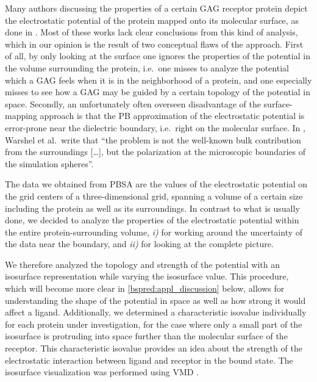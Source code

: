 Many authors discussing the properties of a certain GAG receptor protein depict
the electrostatic potential of the protein mapped onto its molecular surface, as
done in \cite{rogers_gag_prot_prot_2011,%
Gandhi01102009,sapay_hs_growthfactors_2011,%
gandhi_bmp_heparin_binding_sites_2012,sost_heparin_2009,%
catK_cs4_crystal_structure_2008,hydrolase_gags_2011,gandhi_structure_2008,%
imberty_gag_prot_carbres_2007,gags_as_polyelectrolytes_2010}. Most of these
works lack clear conclusions from this kind of analysis, which in our opinion is
the result of two conceptual flaws of the approach. First of all, by only
looking at the surface one ignores the properties of the potential in the volume
surrounding the protein, i.e.\ one misses to analyze the potential which a GAG
feels when it is in the neighborhood of a protein, and one especially misses to
see how a GAG may be guided by a certain topology of the potential in space.
Secondly, an unfortunately often overseen disadvantage of the surface-mapping
approach is that the PB approximation of the electrostatic potential is
 error-prone near the dielectric boundary, i.e.\ right on the
molecular surface. In \cite{estatic_proteins_warshel_2006}, Warshel et al.\
write that \enquote{the problem is not the well-known bulk contribution from the
surroundings [\dots], but the polarization at the microscopic boundaries of the
simulation spheres}.

The data we obtained from PBSA are the values of the electrostatic potential on
the grid centers of a three-dimensional grid, spanning a volume of a certain
size including the protein as well as its surroundings. In contrast to what is
usually done, we decided to analyze the properties of the electrostatic
potential within the entire protein-surrounding volume, \textit{i)} for working
around the uncertainty of the data near the boundary, and \textit{ii)} for
looking at the complete picture.

We therefore analyzed the topology and strength of the potential with an
isosurface representation while varying the isosurface value. This procedure,
which will become more clear in \cref{bspred:appl_discussion} below, allows for
understanding the shape of the potential in space as well as how strong it would
affect a ligand. Additionally, we determined a characteristic isovalue
individually for each protein under investigation, for the case where only a
small part of the isosurface is protruding into space further than the molecular
surface of the receptor. This characteristic isovalue provides an idea about the
strength of the electrostatic interaction between ligand and receptor in the
bound state. The isosurface visualization was performed using VMD
\cite{vmd_1996}.


